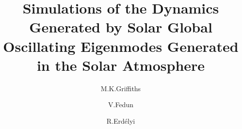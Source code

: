 \documentclass[final,1p]{elsarticle}
\begin{document}
\title{Simulations of the Dynamics Generated by Solar Global  Oscillating Eigenmodes Generated in the Solar Atmosphere}
\author[swat,cics]{M.K.Griffiths }
\author[acse]{V.Fedun}
\author[swat]{R.Erd\'{e}lyi}
\address[swat]{Solar Physics and Space Plasma Research Centre ($SP^{2}RC$), School of Mathematics and Statistics, University of Sheffield, Hicks Building, Hounsfield Road, S7 3RH, UK}
\address[cics]{Corporate Information and Computing Services, The University of Sheffield, 10-12 Brunswick Street, Sheffield, S10 2FN, UK}
\address[acse]{Department of Automatic Control and Systems Engineering, The University of Sheffield, Mappin Street, Sheffield, S1 3JD, UK}
\end{document}
